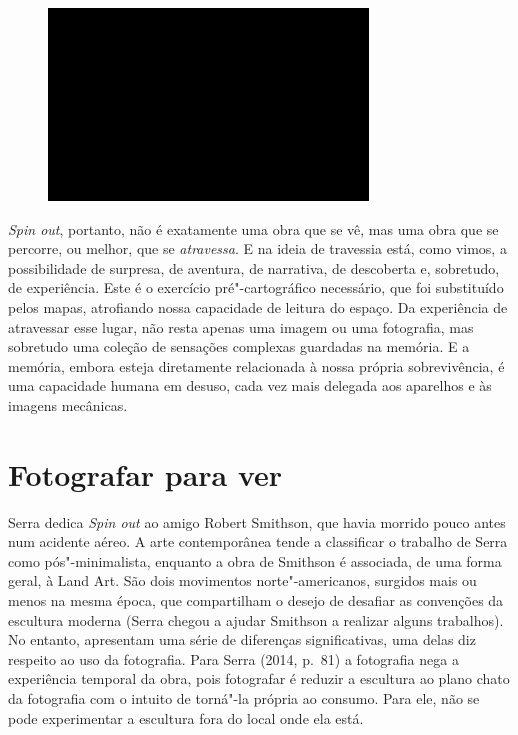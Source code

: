 \begin{figure}[!ht]

\centering
 \includegraphics[width=85mm]{./imgs/im1.jpg}
\caption{\tiny{}}

\end{figure}

\emph{Spin out}, portanto, não é exatamente uma obra que se vê, mas uma
obra que se percorre, ou melhor, que se \emph{atravessa}. E na ideia de
travessia está, como vimos, a possibilidade de surpresa, de aventura, de
narrativa, de descoberta e, sobretudo, de experiência. Este é o
exercício pré"-cartográfico necessário, que foi substituído pelos mapas,
atrofiando nossa capacidade de leitura do espaço. Da experiência de
atravessar esse lugar, não resta apenas uma imagem ou uma fotografia,
mas sobretudo uma coleção de sensações complexas guardadas na memória. E
a memória, embora esteja diretamente relacionada à nossa própria
sobrevivência, é uma capacidade humana em desuso, cada vez mais delegada
aos aparelhos e às imagens mecânicas.

\chapter{Fotografar para ver}

Serra dedica \emph{Spin out} ao amigo Robert Smithson, que havia morrido
pouco antes num acidente aéreo. A arte contemporânea tende a classificar
o trabalho de Serra como pós"-minimalista, enquanto a obra de Smithson é
associada, de uma forma geral, à Land Art. São dois movimentos
norte"-americanos, surgidos mais ou menos na mesma época, que
compartilham o desejo de desafiar as convenções da escultura moderna
(Serra chegou a ajudar Smithson a realizar alguns trabalhos). No
entanto, apresentam uma série de diferenças significativas, uma delas
diz respeito ao uso da fotografia. Para Serra (2014, p.~81) a fotografia
nega a experiência temporal da obra, pois fotografar é reduzir a
escultura ao plano chato da fotografia com o intuito de torná"-la própria
ao consumo. Para ele, não se pode experimentar a escultura fora do local
onde ela está.

